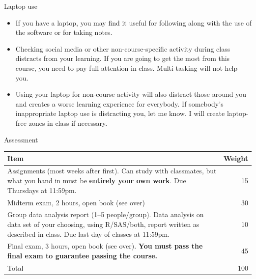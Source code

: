 \documentclass[ignorenonframetext,]{beamer}
\providecommand{\tightlist}{%
  \setlength{\itemsep}{0pt}\setlength{\parskip}{0pt}}
\begin{document}
\begin{frame}{Laptop use}
\protect\hypertarget{laptop-use}{}

\begin{itemize}
\tightlist
\item
  If you have a laptop, you may find it useful for following along with
  the use of the software or for taking notes.
\item
  Checking social media or other non-course-specific activity during
  class distracts from your learning. If you are going to get the most
  from this course, you need to pay full attention in class.
  Multi-tasking will not help you.
\item
  Using your laptop for non-course activity will also distract those
  around you and creates a worse learning experience for everybody. If
  somebody's inappropriate laptop use is distracting you, let me know. I
  will create laptop-free zones in class if necessary.
\end{itemize}

\end{frame}

\begin{frame}{Assessment}
\protect\hypertarget{assessment}{}

\begin{tabular}{p{3.5in}r}
    \hline
    Item & Weight\\
    \hline
    Assignments (most weeks after first). Can study with classmates, but what you hand in must
    be \textbf{entirely your own work}. Due Thursdays at 11:59pm. & 15\\
    \hline
    Midterm exam, 2 hours, open book (see over) & 30\\
    \hline
    Group data analysis report (1--5 people/group). Data analysis on data set of your choosing,
    using R/SAS/both, report written as described in class.
    Due last
    day of classes at 11:59pm. & 10 \\
    \hline
    Final exam, 3 hours, open book (see over). \textbf{You must pass
    the final exam to guarantee passing the course.} & 45\\
    \hline
    Total & 100\\
    \hline
  \end{tabular}

\end{frame}
\end{document}
